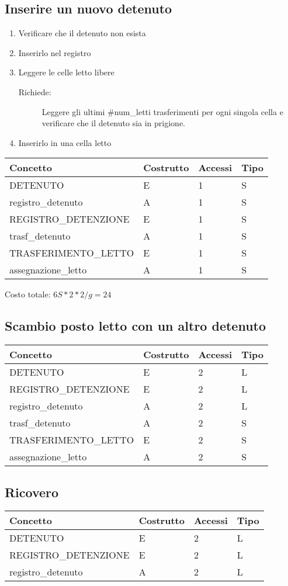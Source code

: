 \documentclass[a4paper,12pt]{report}
\begin{document}
\subsection{Inserire un nuovo detenuto}
\begin{enumerate}
    \item Verificare che il detenuto non esista
    \item Inserirlo nel registro
    \item Leggere le celle letto libere
        \begin{description}
            \item[Richiede:] Leggere gli ultimi \#num\_letti trasferimenti per ogni singola cella e verificare che il detenuto sia in prigione.
        \end{description}
    \item Inserirlo in una cella letto
\end{enumerate}
\begin{table}[H]
\begin{tabular}{p{5cm} p{2cm} p{1cm} p{1cm}}
\hline
Concetto & Costrutto & Accessi & Tipo \\ \hline
DETENUTO & E & 1 & S \\
registro\_detenuto & A & 1 & S \\
REGISTRO\_DETENZIONE & E & 1 & S \\
trasf\_detenuto & A & 1 & S \\
TRASFERIMENTO\_LETTO & E & 1 & S \\
assegnazione\_letto & A & 1 & S \\
\end{tabular}
\end{table}
Costo totale: \(6S * 2 * 2/g= 24\)
\subsection{Scambio posto letto con un altro detenuto}
\begin{table}[H]
\begin{tabular}{p{5cm} p{2cm} p{1cm} p{1cm}}
\hline
Concetto & Costrutto & Accessi & Tipo \\ \hline
DETENUTO & E & 2 & L \\
REGISTRO\_DETENZIONE & E & 2 & L \\
registro\_detenuto & A & 2 & L \\
trasf\_detenuto & A & 2 & S \\
TRASFERIMENTO\_LETTO & E & 2 & S \\
assegnazione\_letto & A & 2 & S \\
\end{tabular}
\end{table}
\subsection{Ricovero}
\begin{table}[H]
\begin{tabular}{p{5cm} p{2cm} p{1cm} p{1cm}}
\hline
Concetto & Costrutto & Accessi & Tipo \\ \hline
DETENUTO & E & 2 & L \\
REGISTRO\_DETENZIONE & E & 2 & L \\
registro\_detenuto & A & 2 & L \\
\end{tabular}
\end{table}
\end{document}
